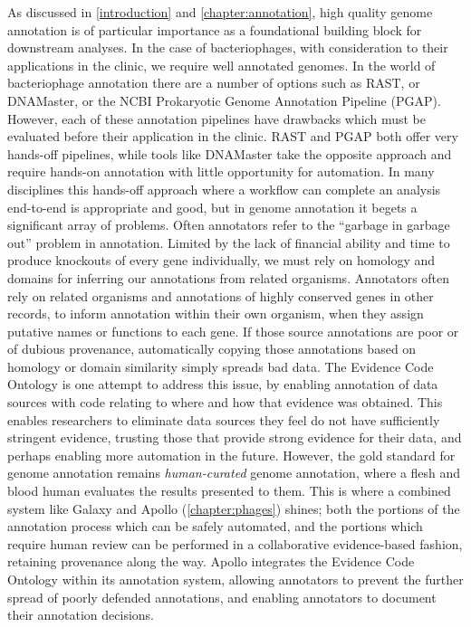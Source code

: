 As discussed in \cref{introduction} and \cref{chapter:annotation}, high quality genome annotation is of particular importance as a foundational building block for downstream analyses. In the case of bacteriophages, with consideration to their applications in the clinic, we require well annotated genomes\cite{Nilsson_2014,Philipson_2018}. In the world of bacteriophage annotation there are a number of options such as RAST\cite{Overbeek_2013}, or DNAMaster\cite{Pope_2017}, or the NCBI Prokaryotic Genome Annotation Pipeline (PGAP)\cite{Tatusova_2016}. However, each of these annotation pipelines have drawbacks which must be evaluated before their application in the clinic. RAST and PGAP both offer very hands-off pipelines, while tools like DNAMaster take the opposite approach and require hands-on annotation with little opportunity for automation. In many disciplines this hands-off approach where a workflow can complete an analysis end-to-end is appropriate and good, but in genome annotation it begets a significant array of problems\cite{Danchin_2018,Ramsey_2021,Li_2012,Drabkin_2012}. Often annotators refer to the ``garbage in garbage out'' problem in annotation. Limited by the lack of financial ability and time to produce knockouts of every gene individually, we must rely on homology and domains for inferring our annotations from related organisms. Annotators often rely on related organisms and annotations of highly conserved genes in other records, to inform annotation within their own organism, when they assign putative names or functions to each gene. If those source annotations are poor or of dubious provenance, automatically copying those annotations based on homology or domain similarity simply spreads bad data. The Evidence Code Ontology\cite{Chibucos_2014} is one attempt to address this issue, by enabling annotation of data sources with code relating to where and how that evidence was obtained. This enables researchers to eliminate data sources they feel do not have sufficiently stringent evidence, trusting those that provide strong evidence for their data, and perhaps enabling more automation in the future. However, the gold standard for genome annotation remains \emph{human-curated} genome annotation, where a flesh and blood human evaluates the results presented to them. This is where a combined system like Galaxy and Apollo (\cref{chapter:phages}) shines; both the portions of the annotation process which can be safely automated, and the portions which require human review can be performed in a collaborative evidence-based fashion, retaining provenance along the way. Apollo integrates the Evidence Code Ontology within its annotation system, allowing annotators to prevent the further spread of poorly defended annotations, and enabling annotators to document their annotation decisions.

